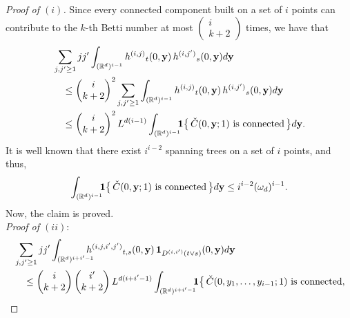 \documentclass[11pt]{amsart}
\numberwithin{equation}{section}
\theoremstyle{plain}
\theoremstyle{definition}
\begin{document}
\begin{proof}[Proof of $(i)$]
Since every connected component built on a set of $i$ points can contribute to the $k$-th Betti number at most $\begin{pmatrix} i \\ k+2 \end{pmatrix}$ times, we have that
\begin{align*}
&\sum_{j, {j^{\prime}} \geq1} j {j^{\prime}} \int_{({{\mathbb R}}^d)^{i-1}} {h^{(i,j)}}_t(0,{{\bf y}})\, {h^{(i,{j^{\prime}})}}_s(0,{{\bf y}}) d{{\bf y}} \\
&\quad \leq \begin{pmatrix} i \\ k+2 \end{pmatrix}^2 \sum_{j,{j^{\prime}}\geq1} \int_{({{\mathbb R}}^d)^{i-1}} {h^{(i,j)}}_t(0,{{\bf y}})\, {h^{(i,{j^{\prime}})}}_s(0,{{\bf y}}) d{{\bf y}}  \\
&\quad \leq \begin{pmatrix} i \\ k+2 \end{pmatrix}^2 L^{d(i-1)} \int_{({{\mathbb R}}^d)^{i-1}} \hspace{-5pt}{{\bf 1}} \bigl\{ \, \check{C}(0,{{\bf y}}; 1) \text{ is connected} \, \bigr\} d{{\bf y}}.
\end{align*}
It is well known that there exist $i^{i-2}$ spanning trees on a set of $i$ points, and thus,
$$
 \int_{({{\mathbb R}}^d)^{i-1}} \hspace{-5pt}{{\bf 1}} \bigl\{ \, \check{C}(0,{{\bf y}}; 1) \text{ is connected} \, \bigr\} d{{\bf y}} \leq i^{i-2} (\omega_d)^{i-1}.
$$
Now, the claim is proved. \\
\textit{Proof of $(ii)$}:
\begin{align*}
&\sum_{j, {j^{\prime}} \geq1} j {j^{\prime}} \int_{({{\mathbb R}}^d)^{i+{i^{\prime}}-1}} \hspace{-10pt} {h^{(i, j, i^{\prime}, j^{\prime})}}_{t,s} (0,{{\bf y}})\,  {{\bf 1}}_{{D^{(i,{i^{\prime}})}}(t\vee s)}(0,{{\bf y}}) d{{\bf y}} \\
&\quad \leq \begin{pmatrix} i \\ k+2 \end{pmatrix} \begin{pmatrix} {i^{\prime}} \\ k+2 \end{pmatrix} L^{d(i+{i^{\prime}}-1)}\int_{({{\mathbb R}}^d)^{i+{i^{\prime}}-1}} \hspace{-5pt} {{\bf 1}} \bigl\{ \, \check{C}(0,y_1,\dots,y_{i-1}; 1) \text{ is connected},  \\

\end{align*}
\end{proof}
\end{document}
